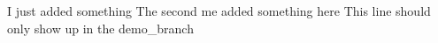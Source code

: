 I just added something
The second me added something here
This line should only show up in the demo_branch

